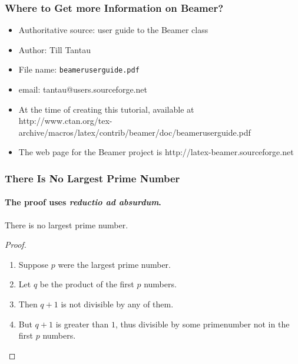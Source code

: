 \documentclass{beamer}
\begin{document}
\begin{frame}
\frametitle{Where to Get more Information on
  Beamer?} 
\begin{itemize}
\item<+-|alert@+> Authoritative source: user guide to the Beamer class
\item<+-|alert@+> Author: Till Tantau
\item<+-|alert@+> File name: 
  {\color{magenta} \tt beameruserguide.pdf} 
\item<+-|alert@+> email: tantau@users.sourceforge.net 
\item<+-|alert@+> At the time of creating this
  tutorial, available at \\
{\color{magenta} \small http://www.ctan.org/tex-archive/macros/latex/contrib/beamer/doc/beameruserguide.pdf}
\item<+-|alert@+> The web page for the Beamer
  project is
{\color{magenta} http://latex-beamer.sourceforge.net}
\end{itemize}
\end{frame}

\begin{frame}\frametitle{There Is No Largest Prime Number}\framesubtitle{The proof uses \textit{reductio ad absurdum}.}\begin{theorem}There is no largest prime number.\end{theorem}\begin{proof}\begin{enumerate}
\item<1-| alert@1> Suppose $p$ were the largest prime number.\item<2-> Let $q$ be the product of the first $p$ numbers.\item<3-> Then $q+1$ is not divisible by any of them.
\item<1-> But $q + 1$ is greater than $1$, thus divisible by some primenumber not in the first $p$ numbers.\qedhere\end{enumerate}\end{proof}\end{frame}
\end{document}

